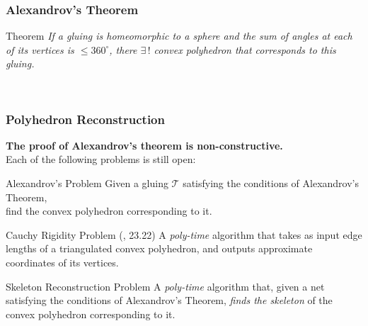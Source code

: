 \begin{frame}
\frametitle{Alexandrov's Theorem}

\vspace{3.8mm}

\begin{block}{Theorem}
	\itshape
	If a gluing is homeomorphic to a sphere and the sum of angles at each of its vertices is
	$\le 360^\circ$\!, there $\exists\,!$ convex polyhedron that corresponds to this gluing.
\end{block} \medskip

\begin{figure}
	\centering
	\begin{subfigure}[m]{0.46\textwidth}
		\centering
		
	\end{subfigure}
~
	\centering
	\begin{subfigure}[m]{0.46\textwidth}
		\centering
		
	\end{subfigure}
\end{figure}

\end{frame}


\begin{frame} \frametitle{Polyhedron Reconstruction}

\textcolor{hard}{\bf The proof of Alexandrov's theorem is non-constructive.} \\
Each of the following problems is still open:

\smallskip

\begin{block}{Alexandrov's Problem} \small
	Given a gluing $\mathcal T$ satisfying the conditions of Alexandrov's Theorem, \\
	find the convex polyhedron corresponding to it.
\end{block}

\begin{block}{Cauchy Rigidity Problem ({\scriptsize {}, 23.22})} \small
	A {\itshape poly-time} algorithm that takes as input edge lengths of a triangulated
	convex polyhedron, and outputs approximate coordinates of its vertices.
\end{block}

\begin{block}{Skeleton Reconstruction Problem} \small
	A {\itshape poly-time} algorithm that, given a net satisfying the conditions of
	Alexandrov's Theorem, {\itshape finds the skeleton} of the
	convex polyhedron corresponding to it.
\end{block} \vspace{2.5mm}
\end{frame}

